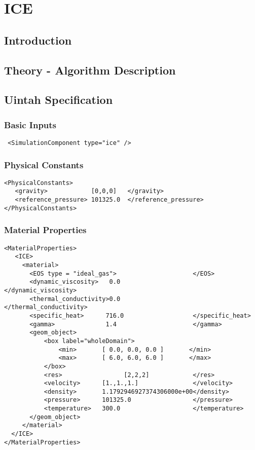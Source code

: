 
\section{ICE}

\subsection{Introduction}

\subsection{Theory - Algorithm Description}

\subsection{Uintah Specification}
\subsubsection{Basic Inputs}
\footnotesize
\begin{verbatim}
 <SimulationComponent type="ice" />
\end{verbatim}
\normalfont
\subsubsection{Physical Constants}
\footnotesize
\begin{verbatim}
<PhysicalConstants>
   <gravity>            [0,0,0]   </gravity>
   <reference_pressure> 101325.0  </reference_pressure>
</PhysicalConstants>
\end{verbatim}
\normalfont
\subsubsection{Material Properties}
\footnotesize
\begin{verbatim}
<MaterialProperties>
   <ICE>
     <material>
       <EOS type = "ideal_gas">                     </EOS>
       <dynamic_viscosity>   0.0                    </dynamic_viscosity>
       <thermal_conductivity>0.0                    </thermal_conductivity>
       <specific_heat>      716.0                   </specific_heat>
       <gamma>              1.4                     </gamma>
       <geom_object>
           <box label="wholeDomain">
               <min>       [ 0.0, 0.0, 0.0 ]       </min>
               <max>       [ 6.0, 6.0, 6.0 ]       </max>
           </box>
           <res>                 [2,2,2]            </res>
           <velocity>      [1.,1.,1.]               </velocity>
           <density>       1.1792946927374306000e+00</density>
           <pressure>      101325.0                 </pressure>     
           <temperature>   300.0                    </temperature>
       </geom_object>
     </material>
  </ICE>       
</MaterialProperties>
\end{verbatim}
\normalfont

